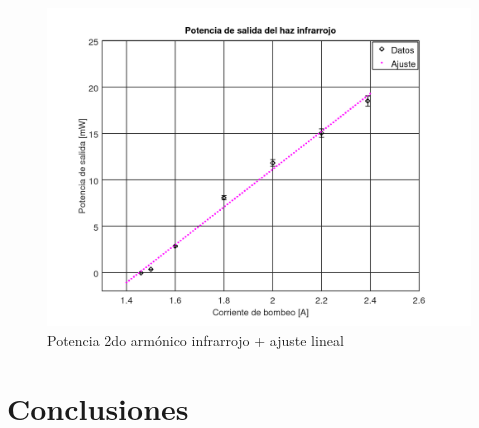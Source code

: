 \documentclass[10pt, a4paper]{article}%
\begin{document}
\begin{multicols}{2}
\begin{figure}[H]
    \centering
    \includegraphics[scale=0.4]{Graficos/pot_infrarrojo.png}
    \caption{Potencia 2do armónico infrarrojo + ajuste lineal}
    \label{potrojo}
\end{figure}



\section{Conclusiones}



\begin{thebibliography}{100}
\end{thebibliography}
\end{multicols}
\end{document}
